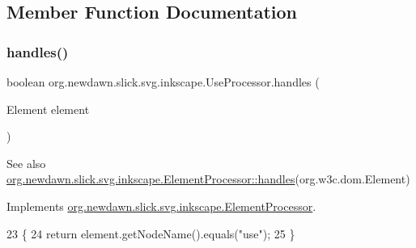\subsection{Member Function Documentation}
\mbox{\label{classorg_1_1newdawn_1_1slick_1_1svg_1_1inkscape_1_1_use_processor_a708b3d8ee6187b45b27913116c689e43}} 
\subsubsection{\texorpdfstring{handles()}{handles()}}
{\footnotesize\ttfamily boolean org.\+newdawn.\+slick.\+svg.\+inkscape.\+Use\+Processor.\+handles (\begin{DoxyParamCaption}\item[{Element}]{element }\end{DoxyParamCaption})\hspace{0.3cm}{\ttfamily [inline]}}

\begin{DoxySeeAlso}{See also}
\mbox{\hyperlink{interfaceorg_1_1newdawn_1_1slick_1_1svg_1_1inkscape_1_1_element_processor_ae95bbf21a67c52aff02cf09259c554a3}{org.\+newdawn.\+slick.\+svg.\+inkscape.\+Element\+Processor\+::handles}}(org.\+w3c.\+dom.\+Element) 
\end{DoxySeeAlso}


Implements \mbox{\hyperlink{interfaceorg_1_1newdawn_1_1slick_1_1svg_1_1inkscape_1_1_element_processor_ae95bbf21a67c52aff02cf09259c554a3}{org.\+newdawn.\+slick.\+svg.\+inkscape.\+Element\+Processor}}.


\begin{DoxyCode}
23                                             \{
24         \textcolor{keywordflow}{return} element.getNodeName().equals(\textcolor{stringliteral}{"use"});
25     \}
\end{DoxyCode}
\mbox{\label{classorg_1_1newdawn_1_1slick_1_1svg_1_1inkscape_1_1_use_processor_ad331d42472c6acee3c1c5ee1ddce27e9}} 
